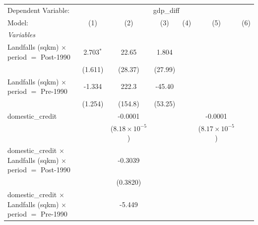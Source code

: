 \begingroup
\centering
\begin{tabular}{lcccccc}
   \tabularnewline \midrule \midrule
   Dependent Variable: & \multicolumn{6}{c}{gdp\_diff}\\
   Model:                                                                                    & (1)         & (2)                     & (3)             & (4)      & (5)                     & (6)\\  
   \midrule
   \emph{Variables}\\
   Landfalls (sqkm) $\times$ period $=$ Post-1990                                            & 2.703$^{*}$ & 22.65                   & 1.804           &          &                         &   \\   
                                                                                             & (1.611)     & (28.37)                 & (27.99)         &          &                         &   \\   
   Landfalls (sqkm) $\times$ period $=$ Pre-1990                                             & -1.334      & 222.3                   & -45.40          &          &                         &   \\   
                                                                                             & (1.254)     & (154.8)                 & (53.25)         &          &                         &   \\   
   domestic\_credit                                                                          &             & -0.0001                 &                 &          & -0.0001                 &   \\   
                                                                                             &             & ($8.18\times 10^{-5}$)  &                 &          & ($8.17\times 10^{-5}$)  &   \\   
   domestic\_credit $\times$ Landfalls (sqkm) $\times$ period $=$ Post-1990                  &             & -0.3039                 &                 &          &                         &   \\   
                                                                                             &             & (0.3820)                &                 &          &                         &   \\   
   domestic\_credit $\times$ Landfalls (sqkm) $\times$ period $=$ Pre-1990                   &             & -5.449                  &                 &          &                         &   \\   

\end{tabular}
